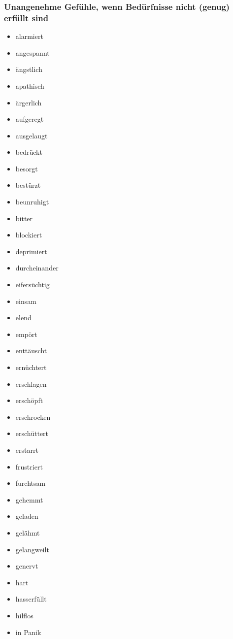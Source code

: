 \subsubsection{Unangenehme Gefühle, wenn Bedürfnisse nicht (genug) erfüllt sind}

\begin{multicols}{2}
  \begin{itemize}
    \item alarmiert
    \item angespannt
    \item ängstlich
    \item apathisch
    \item ärgerlich
    \item aufgeregt
    \item ausgelaugt
    \item bedrückt
    \item besorgt
    \item bestürzt
    \item beunruhigt
    \item bitter
    \item blockiert
    \item deprimiert
    \item durcheinander
    \item eifersüchtig
    \item einsam
    \item elend
    \item empört
    \item enttäuscht
    \item ernüchtert
    \item erschlagen
    \item erschöpft
    \item erschrocken
    \item erschüttert
    \item erstarrt
    \item frustriert
    \item furchtsam
    \item gehemmt
    \item geladen
    \item gelähmt
    \item gelangweilt
    \item genervt
    \item hart
    \item hasserfüllt
    \item hilflos
    \item in Panik

\end{itemize}
\end{multicols}
